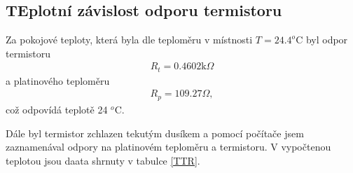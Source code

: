\documentclass[a4paper,12pt]{article}
\begin{document}
\begin{figure}
\scalebox{0.7}{

}
\label{g1}
\end{figure}

\subsection{TEplotní závislost odporu termistoru}
Za pokojové teploty, která byla dle teploměru v místnosti $T=24.4 ^o$C byl odpor termistoru
\begin{eqnarray}
R_t=0.4602 \mbox{k}\Omega
\end{eqnarray}
a platinového teploměru
\begin{eqnarray}
R_p=109.27 \Omega,
\end{eqnarray}
což odpovídá teplotě 24 $^o$C.

Dále byl termistor zchlazen tekutým dusíkem a pomocí počítače jsem zaznamenával odpory 
na platinovém teploměru a termistoru. V vypočtenou teplotou jsou daata shrnuty v tabulce \ref{TTR}.
\end{document}
